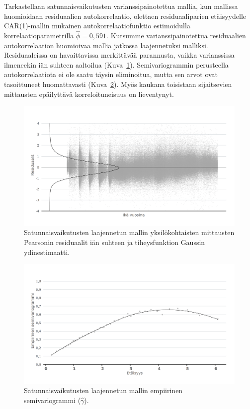 \documentclass[finnish]{docopts}
\begin{document}
Tarkastellaan satunnaisvaikutusten varianssipainotettua mallia, kun mallissa huomioidaan residuaalien autokorrelaatio, olettaen residuaaliparien etäisyydelle CAR(1)-mallin mukainen autokorrelaatiofunktio estimoidulla korrelaatioparametrilla $\hat{\phi} = 0,591$. Kutsumme varianssipainotettua residuaalien autokorrelaation huomioivaa mallia jatkossa laajennetuksi malliksi.\\

Residuaaleissa on havaittavissa merkittävää parannusta, vaikka varianssissa ilmeneekin iän suhteen aaltoilua (Kuva~\ref{fig:lme2_ika_vc_resid}). Semivariogrammin perusteella autokorrelaatiota ei ole saatu täysin eliminoitua, mutta sen arvot ovat tasoittuneet huomattavasti (Kuva~\ref{fig:lme2_vc_vario}). Myös kaukana toisistaan sijaitsevien mittausten epäilyttävä korreloituneisuus on lieventynyt.\\

\begin{figure}[H]
\centering
  \includegraphics[scale=0.8]{kuvaajat/lme2_ika_vc_residuaalit.png}
  \caption{Satunnaisvaikutusten laajennetun mallin yksilökohtaisten mittausten Pearsonin residuaalit iän suhteen ja tiheysfunktion Gaussin ydinestimaatti.}
  \label{fig:lme2_ika_vc_resid}
\end{figure}

\begin{figure}[H]
\centering
  \includegraphics[scale=0.8]{kuvaajat/lme2_vc_vario.png}
  \caption{Satunnaisvaikutusten laajennetun mallin empiirinen semivariogrammi ($\hat{\gamma}$).}
  \label{fig:lme2_vc_vario}
\end{figure}
\end{document}
